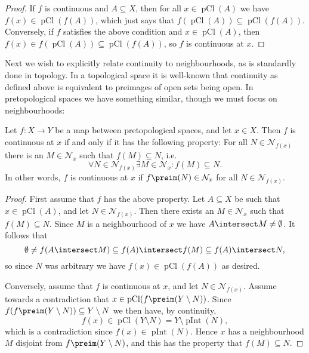 \documentclass[article, a4paper, 11pt, oneside]{memoir}
\numberwithin{equation}{chapter}
\newcommand{\calN}{\mathcal{N}}
\newcommand{\nhoods}[1]{\calN_{#1}}
\newcommand{\pInt}[1]{\operatorname{pInt}(#1)}
\newcommand{\pCl}[1]{\operatorname{pCl}(#1)}
\begin{document}
\begin{proof}
    If $f$ is continuous and $A \subseteq X$, then for all $x \in \pCl{A}$ we have $f(x) \in \pCl{f(A)}$, which just says that $f(\pCl{A}) \subseteq \pCl{f(A)}$. Conversely, if $f$ satisfies the above condition and $x \in \pCl{A}$, then $f(x) \in f(\pCl{A}) \subseteq \pCl{f(A)}$, so $f$ is continuous at $x$.
\end{proof}

Next we wish to explicitly relate continuity to neighbourhoods, as is standardly done in topology. In a topological space it is well-known that continuity as defined above is equivalent to preimages of open sets being open. In pretopological spaces we have something similar, though we must focus on neighbourhoods:

\begin{proposition}
    Let $f \colon X \to Y$ be a map between pretopological spaces, and let $x \in X$. Then $f$ is continuous at $x$ if and only if it has the following property: For all $N \in \nhoods{f(x)}$ there is an $M \in \nhoods{x}$ such that $f(M) \subseteq N$, i.e.
    \begin{equation*}
        \forall N \in \nhoods{f(x)} \exists M \in \nhoods{x} \colon f(M) \subseteq N.
    \end{equation*}
    In other words, $f$ is continuous at $x$ if $f\preim(N) \in \nhoods{x}$ for all $N \in \nhoods{f(x)}$.
\end{proposition}

\begin{proof}
    First assume that $f$ has the above property. Let $A \subseteq X$ be such that $x \in \pCl{A}$, and let $N \in \nhoods{f(x)}$. Then there exists an $M \in \nhoods{x}$ such that $f(M) \subseteq N$. Since $M$ is a neighbourhood of $x$ we have $A \intersect M \neq \emptyset$. It follows that
    \begin{equation*}
        \emptyset
            \neq f(A \intersect M)
            \subseteq f(A) \intersect f(M)
            \subseteq f(A) \intersect N,
    \end{equation*}
    so since $N$ was arbitrary we have $f(x) \in \pCl{f(A)}$ as desired.

    Conversely, assume that $f$ is continuous at $x$, and let $N \in \nhoods{f(x)}$. Assume towards a contradiction that $x \in \pCl{f\preim(Y \setminus N)}$. Since $f(f\preim(Y \setminus N)) \subseteq Y \setminus N$ we then have, by continuity,
    \begin{equation*}
        f(x)
            \in \pCl{Y \setminus N}
            = Y \setminus \pInt{N},
    \end{equation*}
    which is a contradiction since $f(x) \in \pInt{N}$. Hence $x$ has a neighbourhood $M$ disjoint from $f\preim(Y \setminus N)$, and this has the property that $f(M) \subseteq N$.
\end{proof}
\end{document}
